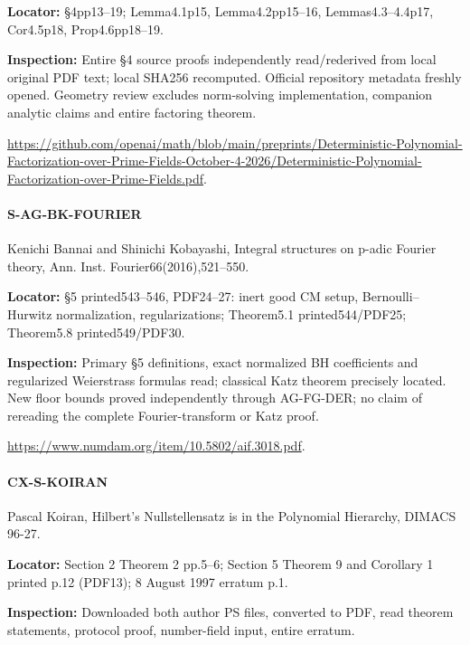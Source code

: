 \documentclass[11pt,a4paper]{article}
\begin{document}
\textbf{Locator:} §4pp13–\allowbreak{}19; Lemma4.\allowbreak{}1p15, Lemma4.\allowbreak{}2pp15–\allowbreak{}16, Lemmas4.\allowbreak{}3–\allowbreak{}4.\allowbreak{}4p17, Cor4.\allowbreak{}5p18, Prop4.\allowbreak{}6pp18–\allowbreak{}19.

\textbf{Inspection:} Entire §4 source proofs independently read/\allowbreak{}rederived from local original PDF text; local SHA256 recomputed.\allowbreak{} Official repository metadata freshly opened.\allowbreak{} Geometry review excludes norm-solving implementation, companion analytic claims and entire factoring theorem.\allowbreak{}

\url{https://github.com/openai/math/blob/main/preprints/Deterministic-Polynomial-Factorization-over-Prime-Fields-October-4-2026/Deterministic-Polynomial-Factorization-over-Prime-Fields.pdf}.

\paragraph{S-AG-BK-FOURIER} Kenichi Bannai and Shinichi Kobayashi, Integral structures on p-adic Fourier theory, Ann.\allowbreak{} Inst.\allowbreak{} Fourier66(2016),521–\allowbreak{}550.

\textbf{Locator:} §5 printed543–\allowbreak{}546, PDF24–\allowbreak{}27:\allowbreak{} inert good CM setup, Bernoulli–\allowbreak{}Hurwitz normalization, regularizations; Theorem5.\allowbreak{}1 printed544/\allowbreak{}PDF25; Theorem5.\allowbreak{}8 printed549/\allowbreak{}PDF30.

\textbf{Inspection:} Primary §5 definitions, exact normalized BH coefficients and regularized Weierstrass formulas read; classical Katz theorem precisely located.\allowbreak{} New floor bounds proved independently through AG-FG-DER; no claim of rereading the complete Fourier-transform or Katz proof.\allowbreak{}

\url{https://www.numdam.org/item/10.5802/aif.3018.pdf}.

\paragraph{CX-S-KOIRAN} Pascal Koiran, Hilbert’s Nullstellensatz is in the Polynomial Hierarchy, DIMACS 96-27.

\textbf{Locator:} Section 2 Theorem 2 pp.\allowbreak{}5–\allowbreak{}6; Section 5 Theorem 9 and Corollary 1 printed p.\allowbreak{}12 (PDF13); 8 August 1997 erratum p.\allowbreak{}1.

\textbf{Inspection:} Downloaded both author PS files, converted to PDF, read theorem statements, protocol proof, number-field input, entire erratum.\allowbreak{}
\end{document}
